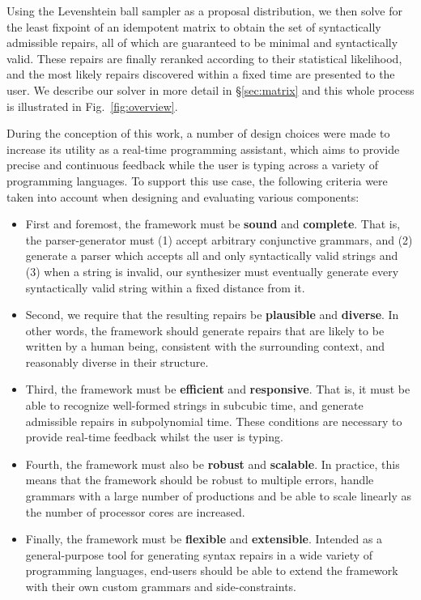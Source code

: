 \documentclass[sigplan,review,anonymous,acmsmall]{acmart}\settopmatter{printfolios=false,printccs=false,printacmref=false}
\begin{document}
Using the Levenshtein ball sampler as a proposal distribution, we then solve for the least fixpoint of an idempotent matrix to obtain the set of syntactically admissible repairs, all of which are guaranteed to be minimal and syntactically valid. These repairs are finally reranked according to their statistical likelihood, and the most likely repairs discovered within a fixed time are presented to the user. We describe our solver in more detail in \S\ref{sec:matrix} and this whole process is illustrated in Fig.~\ref{fig:overview}.

During the conception of this work, a number of design choices were made to increase its utility as a real-time programming assistant, which aims to provide precise and continuous feedback while the user is typing across a variety of programming languages. To support this use case, the following criteria were taken into account when designing and evaluating various components:

\begin{itemize}
  \item First and foremost, the framework must be \textbf{sound} and \textbf{complete}. That is, the parser-generator must (1) accept arbitrary conjunctive grammars, and (2) generate a parser which accepts all and only syntactically valid strings and (3) when a string is invalid, our synthesizer must eventually generate every syntactically valid string within a fixed distance from it.
  \item Second, we require that the resulting repairs be \textbf{plausible} and \textbf{diverse}. In other words, the framework should generate repairs that are likely to be written by a human being, consistent with the surrounding context, and reasonably diverse in their structure.
  \item Third, the framework must be \textbf{efficient} and \textbf{responsive}. That is, it must be able to recognize well-formed strings in subcubic time, and generate admissible repairs in subpolynomial time. These conditions are necessary to provide real-time feedback whilst the user is typing.
  \item Fourth, the framework must also be \textbf{robust} and \textbf{scalable}. In practice, this means that the framework should be robust to multiple errors, handle grammars with a large number of productions and be able to scale linearly as the number of processor cores are increased.
  \item Finally, the framework must be \textbf{flexible} and \textbf{extensible}. Intended as a general-purpose tool for generating syntax repairs in a wide variety of programming languages, end-users should be able to extend the framework with their own custom grammars and side-constraints.
\end{itemize}
\end{document}
